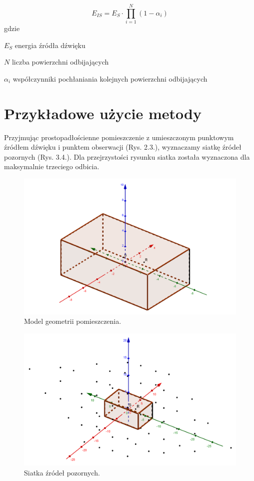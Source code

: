 \begin{equation}
E_{IS}=E_{S}\cdot\prod_{i=1}^{N}(1-\alpha_i)
\end{equation}
gdzie
\begin{eqwhere}[2cm]
        \item[$E_{S}$] energia źródła dźwięku
        \item[$N$] liczba powierzchni odbijających
        \item[$\alpha_i$] współczynniki pochłaniania kolejnych powierzchni odbijających
\end{eqwhere}


\section{Przykładowe użycie metody}\label{sec:przyuzy}

Przyjmując prostopadłościenne pomieszczenie z umieszczonym punktowym źródłem dźwięku i punktem obserwacji (Rys. 2.3.), wyznaczamy siatkę źródeł pozornych (Rys. 3.4.). Dla przejrzystości rysunku siatka została wyznaczona dla maksymalnie trzeciego odbicia.
 
\begin{figure}[h]
        \centering
                \centering
                \includegraphics[width=12cm]{rys3}
	\caption{Model geometrii pomieszczenia.}
\end{figure}

\begin{figure}[h]
        \centering
                \centering
                \includegraphics[width=12cm]{rys4}
	\caption{Siatka źródeł pozornych.}
\end{figure}

